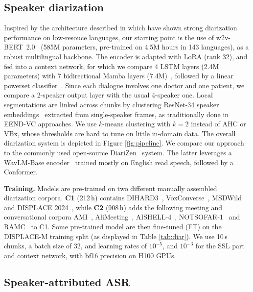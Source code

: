 \documentclass{article}
\begin{document}
\subsection{Speaker diarization}
\label{ssec:diar}

Inspired by the architecture described in \cite{specializing} which have shown strong diarization performance on low-resouce languages, our starting point is the use of w2v-BERT~2.0~\cite{w2vbert} (585M parameters, pre-trained on 4.5M hours in 143 languages), as a robust multilingual backbone. The encoder is adapted with LoRA (rank 32), and fed into a context network, for which we compare 4 LSTM layers (2.4M parameters) with 7 bidirectional Mamba layers (7.4M)~\cite{mamba}, followed by a linear powerset classifier~\cite{Plaquet2023}. 
Since each dialogue involves one doctor and one patient, we compare a 2-speaker output layer with the usual 4-speaker one. Local segmentations are linked across chunks by clustering ResNet-34 speaker embeddings~\cite{wespeaker} extracted from single-speaker frames, as traditionally done in EEND-VC approaches. We use $k$-means clustering with $k{=}2$ instead of AHC or VBx, whose thresholds are hard to tune on little in-domain data. The overall diarization system is depicted in Figure \ref{fig:pipeline}.
We compare our approach to the commonly used open-source DiariZen~\cite{han2025leveraging} system. The latter leverages a WavLM-Base encoder~\cite{wavlm} trained mostly on English read speech, followed by a Conformer.

\vspace{1mm}

\noindent\textbf{Training.} Models are pre-trained on two different manually assembled diarization corpora.
\textbf{C1} (212\,h) contains DIHARD3~\cite{DIHARD}, VoxConverse~\cite{voxconverse}, MSDWild~\cite{MSDWild} and DISPLACE 2024~\cite{displace24}, while
\textbf{C2} (908\,h) adds the following meeting and conversational corpora AMI~\cite{AMI}, AliMeeting~\cite{alimeeting}, AISHELL-4~\cite{aishell4}, NOTSOFAR-1~\cite{notsofar} and RAMC~\cite{RAMC} to C1.
Some pre-trained model are then fine-tuned (FT) on the DISPLACE-M training split (as displayed in Table \ref{tab:diar}).
We use 10\,s chunks, a batch size of 32, and learning rates of $10^{-5}$, and $10^{-3}$ for the SSL part and context network, with bf16 precision on H100 GPUs.

\subsection{Speaker-attributed ASR}
\label{ssec:asr}
\end{document}
